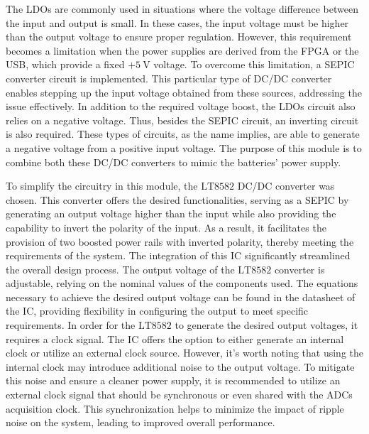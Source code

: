 
\noindent
The \ac{LDO}s are commonly used in situations where the voltage difference between the input and output is small. In these cases, the input voltage must be higher than the output voltage to ensure proper regulation. However, this requirement becomes a limitation when the power supplies are derived from the \ac{FPGA} or the \ac{USB}, which provide a fixed $\mathrm{+5~V}$ voltage. To overcome this limitation, a \ac{SEPIC} converter circuit is implemented. This particular type of \ac{DC}/\ac{DC} converter enables stepping up the input voltage obtained from these sources, addressing the issue effectively. In addition to the required voltage boost, the \ac{LDO}s circuit also relies on a negative voltage. Thus, besides the \ac{SEPIC} circuit, an inverting circuit is also required. These types of circuits, as the name implies, are able to generate a negative voltage from a positive input voltage. The purpose of this module is to combine both these \ac{DC}/\ac{DC} converters to mimic the batteries' power supply. 

To simplify the circuitry in this module, the $\mathrm{LT8582}$ \ac{DC}/\ac{DC} converter was chosen. This converter offers the desired functionalities, serving as a \ac{SEPIC} by generating an output voltage higher than the input while also providing the capability to invert the polarity of the input. As a result, it facilitates the provision of two boosted power rails with inverted polarity, thereby meeting the requirements of the system. The integration of this \ac{IC} significantly streamlined the overall design process. The output voltage of the $\mathrm{LT8582}$ converter is adjustable, relying on the nominal values of the components used. The equations necessary to achieve the desired output voltage can be found in the datasheet of the \ac{IC}, providing flexibility in configuring the output to meet specific requirements. In order for the $\mathrm{LT8582}$ to generate the desired output voltages, it requires a clock signal. The \ac{IC} offers the option to either generate an internal clock or utilize an external clock source. However, it's worth noting that using the internal clock may introduce additional noise to the output voltage. To mitigate this noise and ensure a cleaner power supply, it is recommended to utilize an external clock signal that should be synchronous or even shared with the \ac{ADC}s acquisition clock. This synchronization helps to minimize the impact of ripple noise on the system, leading to improved overall performance.

